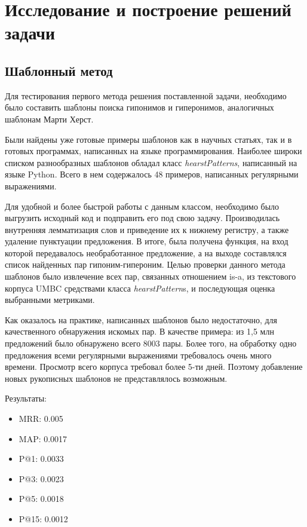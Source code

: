 \section{Исследование и построение решений задачи}
\label{sec:Chapter_4} 
\large




\subsection{Шаблонный метод}

Для тестирования первого метода решения поставленной задачи, необходимо
было составить шаблоны поиска гипонимов и гиперонимов, аналогичных шаблонам
Марти Херст.

Были найдены уже готовые примеры шаблонов как в научных статьях, так и в
готовых программах, написанных на языке программирования. Наиболее широки
списком разнообразных шаблонов обладал класс \textit{hearstPatterns}, написанный на
языке Python. Всего в нем содержалось 48 примеров, написанных регулярными
выражениями.

Для удобной и более быстрой работы с данным классом, необходимо было
выгрузить исходный код и подправить его под свою задачу. Производилась
внутренняя лемматизация слов и приведение их к нижнему регистру, а также
удаление пунктуации предложения. В итоге, была получена функция, на вход
которой передавалось необработанное предложение, а на выходе составлялся
список найденных пар гипоним-гипероним.
Целью проверки данного метода шаблонов было извлечение всех пар, связанных
отношением is-a, из текстового корпуса UMBC средствами класса \textit{hearstPattern}s, и
последующая оценка выбранными метриками.

Как оказалось на практике, написанных шаблонов было недостаточно, для
качественного обнаружения искомых пар. В качестве примера: из 1,5 млн
предложений было обнаружено всего 8003 пары. Более того, на обработку одно
предложения всеми регулярными выражениями требовалось очень много времени.
Просмотр всего корпуса требовал более 5-ти дней. Поэтому добавление новых
рукописных шаблонов не представлялось возможным.

Результаты:

\begin{itemize}
\item MRR: 0.005
\item MAP: 0.0017
\item P@1: 0.0033
\item P@3: 0.0023
\item P@5: 0.0018
\item P@15: 0.0012
\end{itemize}

